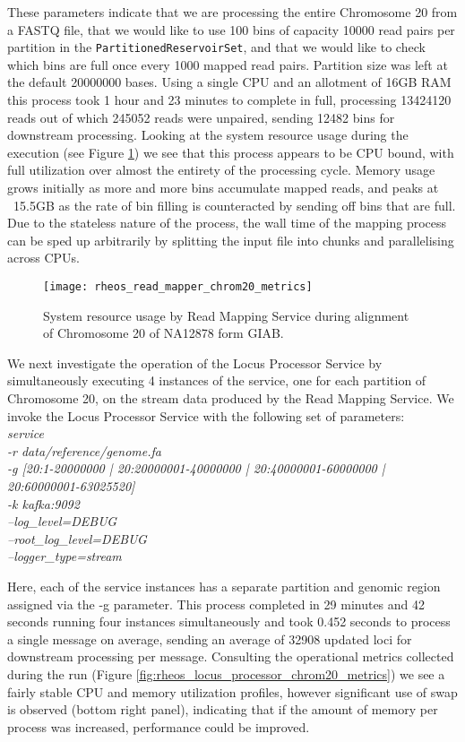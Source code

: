 These parameters indicate that we are processing the entire Chromosome 20 from a FASTQ file, that we would like to use 100 bins of capacity 10000 read pairs per partition in the \texttt{PartitionedReservoirSet}, and that we would like to check which bins are full once every 1000 mapped read pairs. Partition size was left at the default 20000000 bases. Using a single CPU and an allotment of 16GB RAM this process took 1 hour and 23 minutes to complete in full, processing 13424120 reads out of which 245052 reads were unpaired, sending 12482 bins for downstream processing. Looking at the system resource usage during the execution (see Figure \ref{fig:rheos_read_mapper_chrom20_metrics}) we see that this process appears to be CPU bound, with full utilization over almost the entirety of the processing cycle. Memory usage grows initially as more and more bins accumulate mapped reads, and peaks at ~15.5GB as the rate of bin filling is counteracted by sending off bins that are full. Due to the stateless nature of the process, the wall time of the mapping process can be sped up arbitrarily by splitting the input file into chunks and parallelising across CPUs.

\begin{figure}[h!]
    \texttt{[image: rheos\_read\_mapper\_chrom20\_metrics]}
    \centering
    \caption {System resource usage by Read Mapping Service during alignment of Chromosome 20 of NA12878 form GIAB.}
    \label{fig:rheos_read_mapper_chrom20_metrics}
\end{figure}

We next investigate the operation of the Locus Processor Service by simultaneously executing 4 instances of the service, one for each partition of Chromosome 20, on the stream data produced by the Read Mapping Service. We invoke the Locus Processor Service with the following set of parameters:
\\
\emph{
    service\\
-r data/reference/genome.fa\\
-g [20:1-20000000 | 20:20000001-40000000 | 20:40000001-60000000 | 20:60000001-63025520]\\
-k kafka:9092\\
--log\_level=DEBUG\\
--root\_log\_level=DEBUG\\
--logger\_type=stream\\
}

Here, each of the service instances has a separate partition and genomic region assigned via the -g parameter. This process completed in 29 minutes and 42 seconds running four instances simultaneously and took 0.452 seconds to process a single message on average, sending an average of 32908 updated loci for downstream processing per message. Consulting the operational metrics collected during the run (Figure \ref{fig:rheos_locus_processor_chrom20_metrics}) we see a fairly stable CPU and memory utilization profiles, however significant use of swap is observed (bottom right panel), indicating that if the amount of memory per process was increased, performance could be improved.


